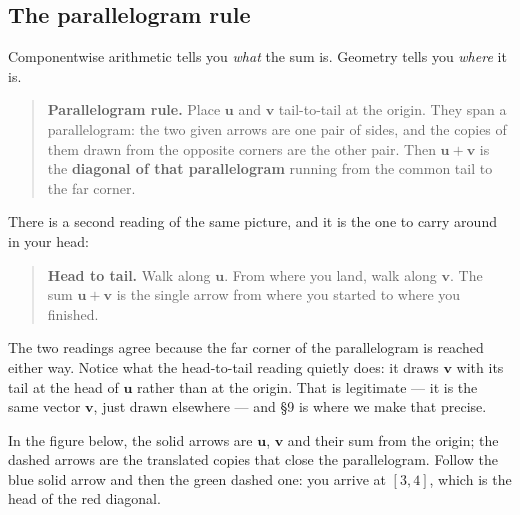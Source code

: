 \documentclass[11pt]{article}
\theoremstyle{definition}
\theoremstyle{remark}
\newcommand{\vc}[1]{\mathbf{#1}}
\newcommand{\lattice}[4]{%
  \draw[step=1cm,gray!25,very thin] (#1,#3) grid (#2,#4);
  \draw[axisline] (#1,0) -- (#2+0.45,0) node[right,font=\scriptsize,black]{$x$};
  \draw[axisline] (0,#3) -- (0,#4+0.45) node[above,font=\scriptsize,black]{$y$};
}
\begin{document}
\subsection{The parallelogram rule}
Componentwise arithmetic tells you \emph{what} the sum is. Geometry tells you
\emph{where} it is.

\begin{quote}
\textbf{Parallelogram rule.} Place $\vc{u}$ and $\vc{v}$ tail-to-tail at the
origin. They span a parallelogram: the two given arrows are one pair of sides,
and the copies of them drawn from the opposite corners are the other pair. Then
$\vc{u}+\vc{v}$ is the \textbf{diagonal of that parallelogram} running from the
common tail to the far corner.
\end{quote}

\noindent There is a second reading of the same picture, and it is the one to
carry around in your head:

\begin{quote}
\textbf{Head to tail.} Walk along $\vc{u}$. From where you land, walk along
$\vc{v}$. The sum $\vc{u}+\vc{v}$ is the single arrow from where you started to
where you finished.
\end{quote}

\noindent The two readings agree because the far corner of the parallelogram is
reached either way. Notice what the head-to-tail reading quietly does: it draws
$\vc{v}$ with its tail at the head of $\vc{u}$ rather than at the origin. That
is legitimate --- it is the same vector $\vc{v}$, just drawn elsewhere --- and
\S9 is where we make that precise.

In the figure below, the solid arrows are $\vc{u}$, $\vc{v}$ and their sum from
the origin; the dashed arrows are the translated copies that close the
parallelogram. Follow the blue solid arrow and then the green dashed one: you
arrive at $[3,4]$, which is the head of the red diagonal.

\begin{center}
\end{center}
\end{document}
